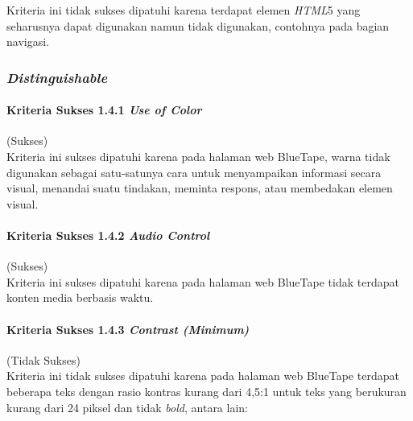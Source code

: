 Kriteria ini tidak sukses dipatuhi karena terdapat elemen \textit{HTML}5 yang seharusnya dapat digunakan namun tidak digunakan, contohnya pada bagian navigasi.

\subsubsection{\textit{Distinguishable}}
\label{subsubsec:kepatuhan_bluetape_distinguishable}

\paragraph{Kriteria Sukses 1.4.1 \textit{Use of Color}}
\label{par:kepatuhan_bluetape_kriteria_sukses_1.4.1}
(Sukses)\\

Kriteria ini sukses dipatuhi karena pada halaman web BlueTape, warna tidak digunakan sebagai satu-satunya cara untuk menyampaikan informasi secara visual, menandai suatu tindakan, meminta respons, atau membedakan elemen visual.

\paragraph{Kriteria Sukses 1.4.2 \textit{Audio Control}}
\label{par:kepatuhan_bluetape_kriteria_sukses_1.4.2}
(Sukses)\\

Kriteria ini sukses dipatuhi karena pada halaman web BlueTape tidak terdapat konten media berbasis waktu.

\paragraph{Kriteria Sukses 1.4.3 \textit{Contrast (Minimum)}}
\label{par:kepatuhan_bluetape_kriteria_sukses_1.4.3}
(Tidak Sukses)\\

Kriteria ini tidak sukses dipatuhi karena pada halaman web BlueTape terdapat beberapa teks dengan rasio kontras kurang dari 4,5:1 untuk teks yang berukuran kurang dari 24 piksel dan tidak \textit{bold}, antara lain:

